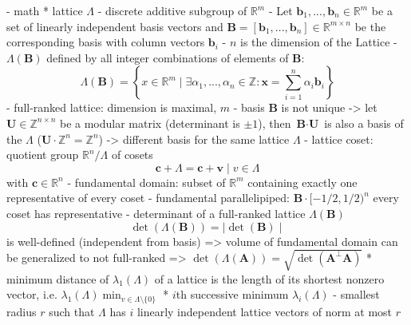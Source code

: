 \documentclass[
  a4paper,  %
  twoside,  %
  bibliography=totoc,
  headsepline,
  cleardoublepage=empty,
  parskip=half,
  draft=false
]{scrbook}
\begin{document}
- math %
  * lattice $\Lambda$ %
    - discrete additive subgroup of $\mathbb{R}^m$ %
    - Let $\textbf{b}_1, ..., \textbf{b}_n \in \mathbb{R}^m$ be a set of linearly independent basis vectors and $\textbf{B} = \left[\textbf{b}_1, ..., \textbf{b}_n\right] \in \mathbb{R}^{m\times n}$ be the corresponding basis with column vectors $\textbf{b}_i$
    - $n$ is the dimension of the Lattice
    - $\Lambda(\textbf{B})$ defined by all integer combinations of elements of $\textbf{B}$:
    \begin{equation}
      \Lambda(\textbf{B}) = \left\{ x \in \mathbb{R}^m \mid \exists \alpha_1, ..., \alpha_n \in \mathbb{Z} : \textbf{x} = \sum_{i=1}^n \alpha_i \textbf{b}_i \right\}
    \end{equation} 
    - full-ranked lattice: dimension is maximal, $m$
    - basis $\textbf{B}$ is not unique -> let $\textbf{U}\in \mathbb{Z}^{n\times n}$ be a modular matrix (determinant is $\pm1$), then $\textbf{B}\cdot \textbf{U}$ is also a basis of the $\Lambda$ ($\textbf{U} \cdot \mathbb{Z}^{n} = \mathbb{Z}^{n}$) -> different basis for the same lattice $\Lambda$
    - lattice coset:
      quotient group $\mathbb{R}^n/\Lambda$ of cosets
      \begin{equation*}
        \textbf{c} + \Lambda = {\textbf{c} + \textbf{v} \mid v \in \Lambda}
      \end{equation*}
      with $\textbf{c} \in \mathbb{R}^n$ %
    - fundamental domain: subset of $\mathbb{R}^m$ containing exactly one representative of every coset
    - fundamental parallelipiped: $\textbf{B} \cdot [ - 1/2, 1/2)^n$ every coset has representative  %
    - determinant of a full-ranked lattice $\Lambda(\textbf{B})$
    \begin{equation}
      \det(\Lambda(\textbf{B})) = \mid \det(\textbf{B})\mid
    \end{equation}
      is well-defined (independent from basis) => volume of fundamental domain %
      can be generalized to not full-ranked => $\det(\Lambda(\textbf{A})) = \sqrt{\det(\textbf{A}^\perp \textbf{A})}$
  * minimum distance of $\lambda_1(\Lambda)$ of a lattice is the length of its shortest nonzero vector, i.e. $\lambda_1(\Lambda) \min_{v \in \Lambda \setminus \{0\}}$
  * $i$th successive minimum $\lambda_i(\Lambda)$
    - smallest radius $r$ such that $\Lambda$ has $i$ linearly independent lattice vectors of norm at most $r$
\end{document}

